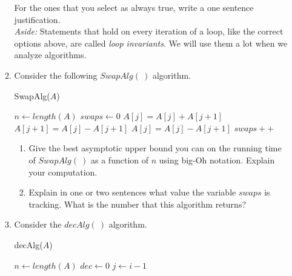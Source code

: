 \documentclass[11pt]{article}
\begin{document}
\begin{enumerate}
\begin{enumerate}
For the ones that you select as always true, write a one sentence justification.\\

\textit{Aside:} Statements that hold on every iteration of a loop, like the correct options above, are called \textit{loop invariants}. We will use them a lot when we analyze  algorithms. 

\item
Consider the following $SwapAlg(\ )$ algorithm. 


\begin{algorithm}[H]
      \caption{SwapAlg($A$)} 
      $n \gets length(A)$ \;
      $swaps \gets 0$\;
      {
       {
       {
       $A[j] = A[j] + A[j+1]$\;
       $A[j+1] = A[j]-A[j+1]$\;
       $A[j] = A[j] - A[j+1]$\;
       $swaps ++$\;
       }
       }
      }
    \end{algorithm}
    
    \begin{enumerate}
    \item Give the best asymptotic upper bound you can on the running time of $SwapAlg(\ )$ as a function of $n$ using big-Oh notation. Explain your computation.
        \item Explain in one or two sentences what value the variable $swaps$ is tracking. What is the number  that this algorithm returns?
        
    \end{enumerate}
    
  \item Consider the $decAlg(\ )$ algorithm.
 
 
 
 \begin{algorithm}[H]
      \caption{decAlg($A$)} 
      $n \gets length(A)$ \;
      $dec \gets 0$\;
      {
      $j \gets i-1$\;
      }
    \end{algorithm}
    
      \begin{enumerate}
       

\end{enumerate}
\end{enumerate}
\end{enumerate}
\end{document}
